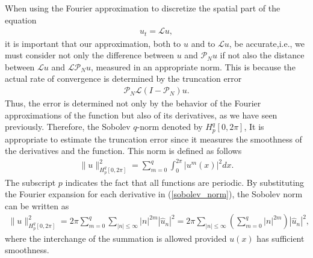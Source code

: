     When using the Fourier approximation to discretize the spatial part of the equation
    \begin{align*}
        u_t = \mathcal{L}u,
    \end{align*}
    it is important that our approximation, both to $u$ and to $\mathcal{L}u$, be accurate,i.e., we must consider not only the difference between $u$ and $\mathcal{P}_N u$ if not also the distance between $\mathcal{L} u$ and $\mathcal{L} \mathcal{P}_N u$, measured in an appropriate norm. This is because the actual rate of convergence is determined by the truncation error    
    \begin{align*}
    	\mathcal{P}_N \mathcal{L} (I - \mathcal{P}_N)u.
    \end{align*}
   	Thus, the error is determined not only by the behavior of the Fourier approximations of the function but also of its derivatives, as we have seen previously. Therefore, the Sobolev $q$-norm denoted by $H^q_p [0, 2\pi]$, It is appropriate to estimate the truncation error since it measures the smoothness of the derivatives and the function. This norm is defined as follows
    \begin{align}
    \label{sobolev_norm}
    	 \|u\|^2_{H^q_p [0, 2\pi]} = \displaystyle \sum^{q}_{m=0} \int^{2\pi}_{0} \left| u^m (x) \right|^2 dx.
    \end{align}
    The subscript $p$ indicates the fact that all functions are periodic. By substituting the Fourier expansion for each derivative in (\ref{sobolev_norm}), the Sobolev norm can be written as
    	\begin{align*}
    	    \|u\|^2_{H^q_p [0, 2\pi]} = 2\pi \displaystyle \sum^{q}_{m=0} \sum_{|n| \leq \infty} |n|^{2m} |\hat{u}_n|^2 = 2\pi \sum_{|n| \leq \infty} \left(\sum^{q}_{m=0} |n|^{2m} \right) |\hat{u}_n|^2,
    	\end{align*}
    where the interchange of the summation is allowed provided $u(x)$ has sufficient smoothness. \\
    
